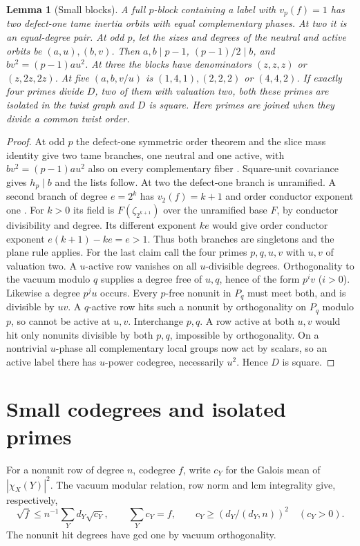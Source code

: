 \documentclass[11pt]{amsart}
\numberwithin{equation}{section}
\newtheorem{lemma}[theorem]{Lemma}
\theoremstyle{definition}
\theoremstyle{plain}
\begin{document}
\begin{lemma}[Small blocks]\label{block:defectone}
A full $p$-block containing a label with $v_p(f)=1$ has two
defect-one tame inertia orbits with equal complementary phases.
At two it is an equal-degree pair. At odd $p$, let the sizes
and degrees of the neutral and active orbits be $(a,u),(b,v)$.
Then $a,b\mid p-1$, $(p-1)/2\mid b$, and $bv^2=(p-1)au^2$.
At three the blocks have denominators $(z,z,z)$ or $(z,2z,2z)$.
At five $(a,b,v/u)$ is $(1,4,1),(2,2,2)$ or $(4,4,2)$.
If exactly four primes divide $D$, two of them with valuation two,
both these primes are isolated in the twist graph and $D$ is square.
Here primes are joined when they divide a common twist order.
\end{lemma}
\begin{proof}
At odd $p$ the defect-one symmetric order theorem and the slice
mass identity give two tame branches, one neutral and one active,
with $bv^2=(p-1)au^2$ also on every complementary fiber
\cite[Proposition~2.13, Corollary~3.10, Proposition~19.11]{BDPcore}.
Square-unit covariance gives $h_p\mid b$ and the lists follow.
At two the defect-one branch is unramified. A second branch of
degree $e=2^k$ has $v_2(f)=k+1$ and order conductor exponent one
\cite[Lemma~2.12]{BDPcore}. For $k>0$ its field is
$F(\zeta_{2^{k+1}})$ over the unramified base $F$, by conductor
divisibility and degree. Its different exponent $ke$ would give
order conductor exponent $e(k+1)-ke=e>1$. Thus both branches are
singletons and the plane rule applies.
For the last claim call the four primes $p,q,u,v$ with $u,v$
of valuation two. A $u$-active row vanishes on all $u$-divisible
degrees. Orthogonality to the vacuum modulo $q$ supplies a degree
free of $u,q$, hence of the form $p^iv$ ($i>0$). Likewise a
degree $p^ju$ occurs. Every $p$-free nonunit in $P_q$ must meet
both, and is divisible by $uv$. A $q$-active row hits such a
nonunit by orthogonality on $P_q$ modulo $p$, so cannot be active
at $u,v$. Interchange $p,q$. A row active at both $u,v$ would hit
only nonunits divisible by both $p,q$, impossible by orthogonality.
On a nontrivial $u$-phase all complementary local groups now act
by scalars, so an active label there has $u$-power codegree,
necessarily $u^2$. Hence $D$ is square.
\end{proof}

\section{Small codegrees and isolated primes}
For a nonunit row of degree $n$, codegree $f$, write $c_Y$ for
the Galois mean of $|\chi_X(Y)|^2$. The vacuum modular relation,
row norm and lcm integrality give, respectively,
\begin{equation}\label{st}
 \sqrt f\le n^{-1}\sum_Yd_Y\sqrt{c_Y},\qquad
 \sum_Y c_Y=f,\qquad c_Y\ge(d_Y/(d_Y,n))^2\quad(c_Y>0).
\end{equation}
The nonunit hit degrees have gcd one by vacuum orthogonality.
\end{document}
